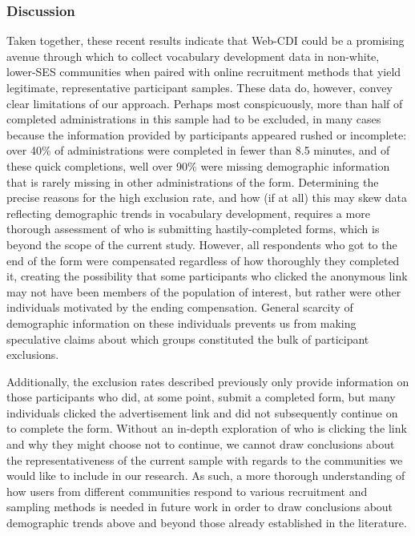 \documentclass[
  english,
  man]{apa7}
\begin{document}
\hypertarget{discussion}{%
\subsubsection{Discussion}\label{discussion}}

Taken together, these recent results indicate that Web-CDI could be a promising avenue through which to collect vocabulary development data in non-white, lower-SES communities when paired with online recruitment methods that yield legitimate, representative participant samples. These data do, however, convey clear limitations of our approach. Perhaps most conspicuously, more than half of completed administrations in this sample had to be excluded, in many cases because the information provided by participants appeared rushed or incomplete: over 40\% of administrations were completed in fewer than 8.5 minutes, and of these quick completions, well over 90\% were missing demographic information that is rarely missing in other administrations of the form. Determining the precise reasons for the high exclusion rate, and how (if at all) this may skew data reflecting demographic trends in vocabulary development, requires a more thorough assessment of who is submitting hastily-completed forms, which is beyond the scope of the current study. However, all respondents who got to the end of the form were compensated regardless of how thoroughly they completed it, creating the possibility that some participants who clicked the anonymous link may not have been members of the population of interest, but rather were other individuals motivated by the ending compensation. General scarcity of demographic information on these individuals prevents us from making speculative claims about which groups constituted the bulk of participant exclusions.

Additionally, the exclusion rates described previously only provide information on those participants who did, at some point, submit a completed form, but many individuals clicked the advertisement link and did not subsequently continue on to complete the form. Without an in-depth exploration of who is clicking the link and why they might choose not to continue, we cannot draw conclusions about the representativeness of the current sample with regards to the communities we would like to include in our research. As such, a more thorough understanding of how users from different communities respond to various recruitment and sampling methods is needed in future work in order to draw conclusions about demographic trends above and beyond those already established in the literature.
\end{document}
